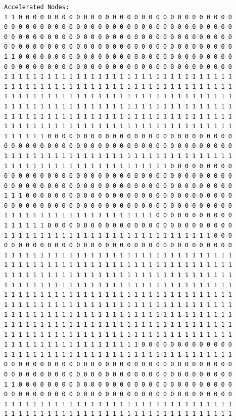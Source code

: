 \documentclass [10 pt, a4 paper]{report}
\begin{document}
\begin{lstlisting}[caption=Output of the simulation once it is finished, label={lst:code1}, frame=single]
Accelerated Nodes:
1 1 0 0 0 0 0 0 0 0 0 0 0 0 0 0 0 0 0 0 0 0 0 0 0 0 0 0 0 0 0 0
0 0 0 0 0 0 0 0 0 0 0 0 0 0 0 0 0 0 0 0 0 0 0 0 0 0 0 0 0 0 0 0
0 0 0 0 0 0 0 0 0 0 0 0 0 0 0 0 0 0 0 0 0 0 0 0 0 0 0 0 0 0 0 0
0 0 0 0 0 0 0 0 0 0 0 0 0 0 0 0 0 0 0 0 0 0 0 0 0 0 0 0 0 0 0 0
1 1 0 0 0 0 0 0 0 0 0 0 0 0 0 0 0 0 0 0 0 0 0 0 0 0 0 0 0 0 0 0
0 0 0 0 0 0 0 0 0 0 0 0 0 0 0 0 0 0 0 0 0 0 0 0 0 0 0 0 0 0 0 0
1 1 1 1 1 1 1 1 1 1 1 1 1 1 1 1 1 1 1 1 1 1 1 1 1 1 1 1 1 1 1 1
1 1 1 1 1 1 1 1 1 1 1 1 1 1 1 1 1 1 1 1 1 1 1 1 1 1 1 1 1 1 1 1
1 1 1 1 1 1 1 1 1 1 1 1 1 1 1 1 1 1 1 1 1 1 1 1 1 1 1 1 1 1 1 1
1 1 1 1 1 1 1 1 1 1 1 1 1 1 1 1 1 1 1 1 1 1 1 1 1 1 1 1 1 1 1 1
1 1 1 1 1 1 1 1 1 1 1 1 1 1 1 1 1 1 1 1 1 1 1 1 1 1 1 1 1 1 1 1
1 1 1 1 1 1 1 1 1 1 1 1 1 1 1 1 1 1 1 1 1 1 1 1 1 1 1 1 1 1 1 1
1 1 1 1 1 1 0 0 0 0 0 0 0 0 0 0 0 0 0 0 0 0 0 0 0 0 0 0 0 0 0 0
0 0 0 0 0 0 0 0 0 0 0 0 0 0 0 0 0 0 0 0 0 0 0 0 0 0 0 0 0 0 0 0
1 1 1 1 1 1 1 1 1 1 1 1 1 1 1 1 1 1 1 1 1 1 1 1 1 1 1 1 1 1 1 1
1 1 1 1 1 1 1 1 1 1 1 1 1 1 1 1 1 1 1 1 1 1 1 0 0 0 0 0 0 0 0 0
0 0 0 0 0 0 0 0 0 0 0 0 0 0 0 0 0 0 0 0 0 0 0 0 0 0 0 0 0 0 0 0
0 0 0 0 0 0 0 0 0 0 0 0 0 0 0 0 0 0 0 0 0 0 0 0 0 0 0 0 0 0 0 0
1 1 1 0 0 0 0 0 0 0 0 0 0 0 0 0 0 0 0 0 0 0 0 0 0 0 0 0 0 0 0 0
0 0 0 0 0 0 0 0 0 0 0 0 0 0 0 0 0 0 0 0 0 0 0 0 0 0 0 0 0 0 0 0
1 1 1 1 1 1 1 1 1 1 1 1 1 1 1 1 1 1 1 1 1 0 0 0 0 0 0 0 0 0 0 0
1 1 1 1 1 1 0 0 0 0 0 0 0 0 0 0 0 0 0 0 0 0 0 0 0 0 0 0 0 0 0 0
1 1 1 1 1 1 1 1 1 1 1 1 1 1 1 1 1 1 1 1 1 1 1 1 1 1 1 1 1 0 0 0
0 0 0 0 0 0 0 0 0 0 0 0 0 0 0 0 0 0 0 0 0 0 0 0 0 0 0 0 0 0 0 0
1 1 1 1 1 1 1 1 1 1 1 1 1 1 1 1 1 1 1 1 1 1 1 1 1 1 1 1 1 1 1 1
1 1 1 1 1 1 1 1 1 1 1 1 1 1 1 1 1 1 1 1 1 1 1 1 1 1 1 1 1 1 1 1
1 1 1 1 1 1 1 1 1 1 1 1 1 1 1 1 1 1 1 1 1 1 1 1 1 1 1 1 1 1 1 1
1 1 1 1 1 1 1 1 1 1 1 1 1 1 1 1 1 1 1 1 1 1 1 1 1 1 1 1 1 1 1 1
1 1 1 1 1 1 1 1 1 1 1 1 1 1 1 1 1 1 1 1 1 1 1 1 1 1 1 1 1 1 1 1
1 1 1 1 1 1 1 1 1 1 1 1 1 1 1 1 1 1 1 1 1 1 1 1 1 1 1 1 1 1 1 1
1 1 1 1 1 1 1 1 1 1 1 1 1 1 1 1 1 1 1 1 1 1 1 1 1 1 1 1 1 1 1 1
1 1 1 1 1 1 1 1 1 1 1 1 1 1 1 1 1 1 1 1 1 1 1 1 1 1 1 1 1 1 1 1
1 1 1 1 1 1 1 1 1 1 1 1 1 1 1 1 1 1 1 1 1 1 1 1 1 1 1 1 1 1 1 1
1 1 1 1 1 1 1 1 1 1 1 1 1 1 1 1 1 1 1 0 0 0 0 0 0 0 0 0 0 0 0 0
1 1 1 1 1 1 1 1 1 1 1 1 1 1 1 1 1 1 1 1 1 1 1 1 1 1 1 1 1 1 1 1
0 0 0 0 0 0 0 0 0 0 0 0 0 0 0 0 0 0 0 0 0 0 0 0 0 0 0 0 0 0 0 0
0 0 0 0 0 0 0 0 0 0 0 0 0 0 0 0 0 0 0 0 0 0 0 0 0 0 0 0 0 0 0 0
1 1 0 0 0 0 0 0 0 0 0 0 0 0 0 0 0 0 0 0 0 0 0 0 0 0 0 0 0 0 0 0
0 0 0 0 0 0 0 0 0 0 0 0 0 0 0 0 0 0 0 0 0 0 0 0 0 0 0 0 0 0 0 0
1 1 1 1 1 1 1 1 1 1 1 1 1 1 1 1 1 1 1 1 1 1 1 1 1 1 1 1 1 1 1 1
1 1 1 1 1 1 1 1 1 1 1 1 1 1 1 1 1 1 1 1 1 1 1 1 1 1 1 1 1 1 1 1

\end{lstlisting}
\end{document}
